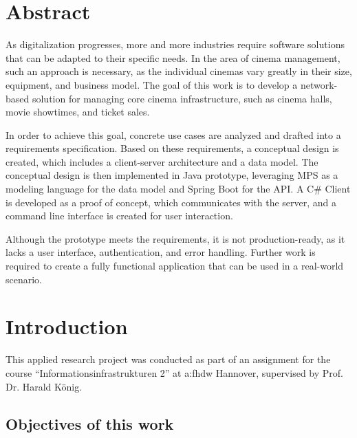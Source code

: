 
\chapter{Abstract}

As digitalization progresses, more and more industries require software solutions that can be adapted to their specific needs. In the area of cinema management, such an approach is necessary, as the individual cinemas vary greatly in their size, equipment, and business model. The goal of this work is to develop a network-based solution for managing core cinema infrastructure, such as cinema halls, movie showtimes, and ticket sales. 

\vspace{.1cm}
\hspace{-.6cm}In order to achieve this goal, concrete use cases are analyzed and drafted into a requirements specification. Based on these requirements, a conceptual design is created, which includes a client-server architecture and a data model. The conceptual design is then implemented in Java prototype, leveraging MPS as a modeling language for the data model and Spring Boot for the API. A C\# Client is developed as a proof of concept, which communicates with the server, and a command line interface is created for user interaction.

\vspace{.1cm}
\hspace{-.6cm}Although the prototype meets the requirements, it is not production-ready, as it lacks a user interface, authentication, and error handling. Further work is required to create a fully functional application that can be used in a real-world scenario.

\chapter{Introduction}
\label{ch:intro}

This applied research project was conducted as part of an assignment for the course \enquote{Informationsinfrastrukturen 2} at \gls{a:fhdw} Hannover, supervised by Prof. Dr. Harald König.

\section{Objectives of this work}

